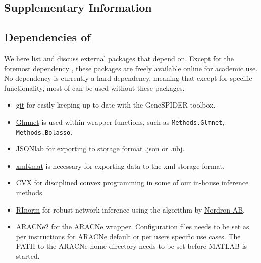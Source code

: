 \clearpage
\renewcommand{\thesection}{S.\arabic{section}}
\renewcommand{\thesubsection}{\thesection.\arabic{subsection}}
\renewcommand{\thefigure}{S.\arabic{figure}}
\renewcommand{\thetable}{S.\arabic{table}}

\makeatletter
\long{}
\makeatother
\setcounter{page}{1}
\setcounter{figure}{0}
\setcounter{section}{0}
\setcounter{table}{0}

\onecolumn
\begin{bibunit}
\section{Supplementary Information}
\label{sec:supplementary}
\subsection{Dependencies of \gs}
\label{sec:dependencies}
We here list and discuss external packages that \gs depend on.
Except for the foremost dependency \citet{MATLAB2014}, these packages are freely available online for academic use.
No dependency is currently a hard dependency, meaning that except for specific functionality, most of \gs can be used without these packages.

\begin{itemize}
\item \href{https://git-scm.com/}{git} for easily keeping up to date with the GeneSPIDER toolbox.
\item \href{https://web.stanford.edu/~hastie/glmnet_matlab/}{Glmnet} \citep{Friedman2010} is used within wrapper functions, such as \texttt{Methods.Glmnet}, \texttt{Methods.Bolasso}.
\item \href{http://www.mathworks.com/matlabcentral/fileexchange/33381-jsonlab--a-toolbox-to-encode-decode-json-files-in-matlab-octave}{JSONlab} for exporting to storage format .json or .ubj.
\item \href{https://www.mathworks.com/matlabcentral/fileexchange/6268-xml4mat-v2-0}{xml4mat} is necessary for exporting data to the xml storage format.
\item \href{http://cvxr.com/cvx/}{CVX} for disciplined convex programming in some of our in-house inference methods.
\item \href{https://bitbucket.org/nordron/nordron-rni}{RInorm} \citep{Nordling2013phdthesis} for robust network inference using the algorithm by \href{http://www.nordron.com}{Nordron AB}.
\item \href{http://califano.c2b2.columbia.edu/ARACNe/}{ARACNe2} for the ARACNe wrapper. Configuration files needs to be set as per instructions for ARACNe default or per users specific use cases. The PATH to the ARACNe home directory needs to be set before MATLAB is started.
\end{itemize}


\end{bibunit}
